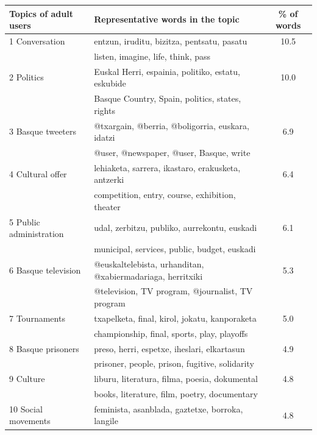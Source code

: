 \documentclass[information,article,submit,moreauthors,pdftex,10pt,a4paper]{Definitions/mdpi}
\begin{document}
\begin{table}[H]
  \centering
  \begin{tabular}{llc}
    \hline
    \textbf{Topics of adult users} &  \textbf{Representative words in the topic} & \textbf{\% of words} \\ \hline \hline
                   1  Conversation & entzun, iruditu, bizitza, pentsatu, pasatu & 10.5  \\
                   & listen, imagine, life, think, pass & \\ \hline
                   2  Politics & Euskal Herri, espainia, politiko, estatu, eskubide & 10.0  \\
                   & Basque Country, Spain, politics, states, rights & \\ \hline
                   3  Basque tweeters & @txargain, @berria, @boligorria, euskara, idatzi & 6.9 \\
                   & @user, @newspaper, @user, Basque, write & \\ \hline
                   4  Cultural offer & lehiaketa, sarrera, ikastaro, erakusketa, antzerki & 6.4  \\
                   & competition, entry, course, exhibition, theater & \\ \hline
                   5  Public administration & udal, zerbitzu, publiko, aurrekontu, euskadi & 6.1  \\
                   & municipal, services, public, budget, euskadi & \\ \hline
                   6  Basque television & @euskaltelebista, urhanditan, @xabiermadariaga, herritxiki & 5.3 \\
                   & @television, TV program, @journalist, TV program & \\ \hline
                   7  Tournaments & txapelketa, final, kirol, jokatu, kanporaketa & 5.0 \\
                   & championship, final, sports, play, playoffs & \\ \hline
                   8  Basque prisoners & preso, herri, espetxe, iheslari, elkartasun & 4.9 \\
                   & prisoner, people, prison, fugitive, solidarity & \\ \hline
                   9  Culture & liburu, literatura, filma, poesia, dokumental & 4.8 \\
                   & books, literature, film, poetry, documentary & \\ \hline
                   10 Social movements & feminista, asanblada, gaztetxe, borroka, langile & 4.8 \\

\end{tabular}
\end{table}
\end{document}
